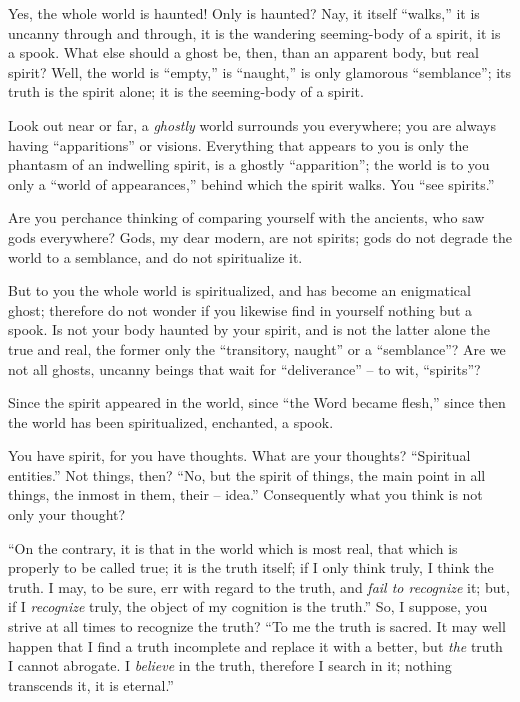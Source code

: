 \documentclass[12pt,a4paper]{book}
\begin{document}
Yes, the whole world is haunted! Only is haunted? Nay, it itself ``walks,'' 
it is uncanny through and through, it is the wandering seeming-body of a 
spirit, it is a spook. What else should a ghost be, then, than an apparent 
body, but real spirit? Well, the world is ``empty,'' is ``naught,'' is 
only glamorous ``semblance''; its truth is the spirit alone; it is the 
seeming-body of a spirit.

Look out near or far, a \textit{ghostly} world surrounds you everywhere; you 
are always having ``apparitions'' or visions. Everything that appears to you 
is only the phantasm of an indwelling spirit, is a ghostly ``apparition''; 
the world is to you only a ``world of appearances,'' behind which the spirit 
walks. You ``see spirits.''

Are you perchance thinking of comparing yourself with the ancients, who saw 
gods everywhere? Gods, my dear modern, are not spirits; gods do not degrade 
the world to a semblance, and do not spiritualize it.

But to you the whole world is spiritualized, and has become an enigmatical 
ghost; therefore do not wonder if you likewise find in yourself nothing but a 
spook. Is not your body haunted by your spirit, and is not the latter alone 
the true and real, the former only the ``transitory, naught'' or a 
``semblance''? Are we not all ghosts, uncanny beings that wait for 
``deliverance'' -- to wit, ``spirits''?

Since the spirit appeared in the world, since ``the Word became flesh,'' 
since then the world has been spiritualized, enchanted, a spook.

You have spirit, for you have thoughts. What are your thoughts? ``Spiritual 
entities.'' Not things, then? ``No, but the spirit of things, the main point 
in all things, the inmost in them, their -- idea.'' Consequently what you 
think is not only your thought?

``On the contrary, it is that in the world which is most real, that which is 
properly to be called true; it is the truth itself; if I only think truly, I 
think the truth. I may, to be sure, err with regard to the truth, and 
\textit{fail to recognize} it; but, if I \textit{recognize} truly, the object 
of my cognition is the truth.'' So, I suppose, you strive at all times to 
recognize the truth? ``To me the truth is sacred. It may well happen that I 
find a truth incomplete and replace it with a better, but \textit{the} truth I 
cannot abrogate. I \textit{believe} in the truth, therefore I search in it; 
nothing transcends it, it is eternal.''
\end{document}
